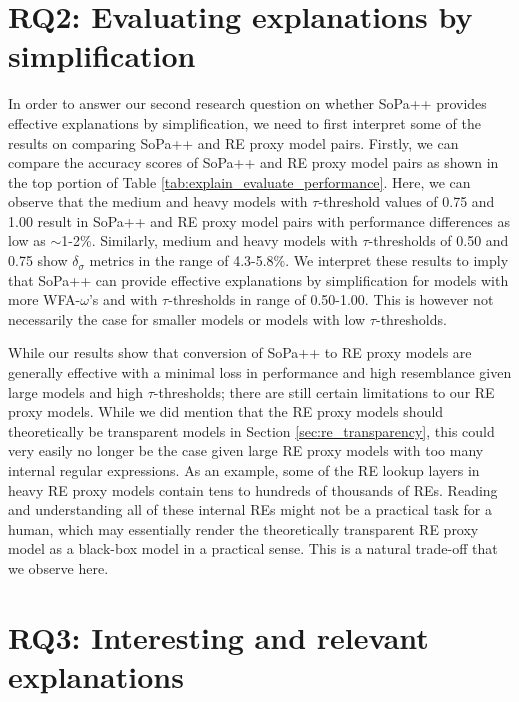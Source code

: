 \section{RQ2: Evaluating explanations by simplification}

In order to answer our second research question on whether SoPa++ provides
effective explanations by simplification, we need to first interpret some of the
results on comparing SoPa++ and RE proxy model pairs. Firstly, we can compare
the accuracy scores of SoPa++ and RE proxy model pairs as shown in the top
portion of Table \ref{tab:explain_evaluate_performance}. Here, we can observe
that the medium and heavy models with $\tau$-threshold values of 0.75 and 1.00
result in SoPa++ and RE proxy model pairs with performance differences as low as
$\sim$1-2$\%$. Similarly, medium and heavy models with $\tau$-thresholds of
0.50 and 0.75 show $\delta_{\sigma}$ metrics in the range of 4.3-5.8$\%$. We
interpret these results to imply that SoPa++ can provide effective explanations
by simplification for models with more WFA-$\omega$'s and with $\tau$-thresholds
in range of 0.50-1.00. This is however not necessarily the case for smaller
models or models with low $\tau$-thresholds.

While our results show that conversion of SoPa++ to RE proxy models are
generally effective with a minimal loss in performance and high resemblance
given large models and high $\tau$-thresholds; there are still certain
limitations to our RE proxy models. While we did mention that the RE proxy
models should theoretically be transparent models in Section
\ref{sec:re_transparency}, this could very easily no longer be the case given
large RE proxy models with too many internal regular expressions. As an example,
some of the RE lookup layers in heavy RE proxy models contain tens to hundreds
of thousands of REs. Reading and understanding all of these internal REs might
not be a practical task for a human, which may essentially render the
theoretically transparent RE proxy model as a black-box model in a practical
sense. This is a natural trade-off that we observe here.

\section{RQ3: Interesting and relevant explanations}

